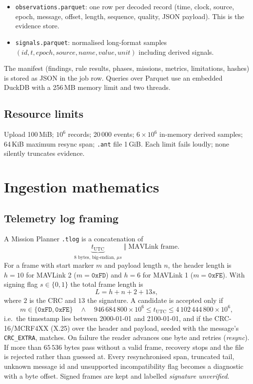 \documentclass[11pt,a4paper]{article}
\newcommand{\code}[1]{\texttt{#1}}
\begin{document}
\begin{itemize}
  \item \code{observations.parquet}: one row per decoded record (time, clock, source, epoch,
        message, offset, length, sequence, quality, JSON payload). This is the evidence store.
  \item \code{signals.parquet}: normalised long-format samples $(id,t,epoch,source,name,value,unit)$
        including derived signals.
\end{itemize}

The manifest (findings, rule results, phases, missions, metrics, limitations, hashes) is stored as
JSON in the job row. Queries over Parquet use an embedded DuckDB with a 256\,MB memory limit and
two threads.

\subsection{Resource limits}
Upload 100\,MiB; $10^6$ records; 20\,000 events; $6\times10^6$ in-memory derived samples; 64\,KiB
maximum resync span; \code{.ant} file 1\,GiB. Each limit fails loudly; none silently truncates
evidence.

\section{Ingestion mathematics}

\subsection{Telemetry log framing}
A Mission Planner \code{.tlog} is a concatenation of
\[
\underbrace{t_{\text{UTC}}}_{8\text{ bytes, big-endian, }\mu s}\;\Vert\;\text{MAVLink frame}.
\]
For a frame with start marker $m$ and payload length $n$, the header length is $h=10$ for MAVLink 2
($m=\mathtt{0xFD}$) and $h=6$ for MAVLink 1 ($m=\mathtt{0xFE}$). With signing flag $s\in\{0,1\}$
the total frame length is
\[
L = h + n + 2 + 13s,
\]
where $2$ is the CRC and $13$ the signature. A candidate is accepted only if
\[
m\in\{\mathtt{0xFD},\mathtt{0xFE}\}\quad\wedge\quad
946\,684\,800\times10^{6} \le t_{\text{UTC}} \le 4\,102\,444\,800\times10^{6},
\]
i.e.\ the timestamp lies between 2000-01-01 and 2100-01-01, and if the CRC-16/MCRF4XX (X.25) over
the header and payload, seeded with the message's \code{CRC\_EXTRA}, matches. On failure the reader
advances one byte and retries (\emph{resync}). If more than $65\,536$ bytes pass without a valid
frame, recovery stops and the file is rejected rather than guessed at. Every resynchronised span,
truncated tail, unknown message id and unsupported incompatibility flag becomes a diagnostic with a
byte offset. Signed frames are kept and labelled \emph{signature unverified}.
\end{document}
